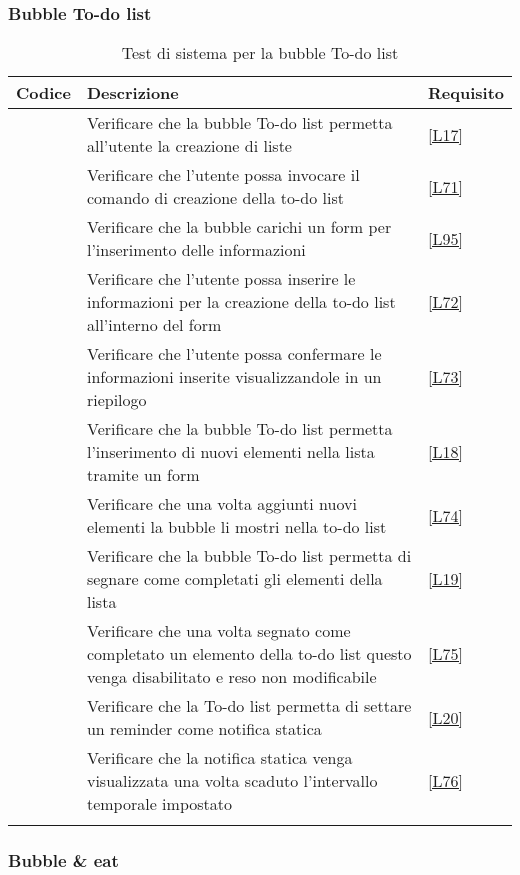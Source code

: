 \subsubsection{Bubble To-do list}

\begin{longtable}{|P{5cm}|P{5cm}|P{5cm}|}
	\hline \textbf{Codice} & \textbf{Descrizione} & \textbf{Requisito} \\
	\endfirsthead
	\hline {} & Verificare che la bubble To-do list permetta all'utente la creazione di liste & \ref{L17} \\
	\hline {} & Verificare che l'utente possa invocare il comando di creazione della to-do list & \ref{L71} \\
	\hline {} & Verificare che la bubble carichi un form per l'inserimento delle informazioni & \ref{L95} \\
	\hline {} & Verificare che l'utente possa inserire le informazioni per la creazione della to-do list all’interno del form & \ref{L72} \\
	\hline {} & Verificare che l'utente possa confermare le informazioni inserite visualizzandole in un riepilogo & \ref{L73} \\
	\hline {} & Verificare che la bubble To-do list permetta l’inserimento di nuovi elementi nella lista tramite un form & \ref{L18} \\
	\hline {} & Verificare che una volta aggiunti nuovi elementi la bubble li mostri nella to-do list & \ref{L74} \\
	\hline {} & Verificare che la bubble To-do list permetta di segnare come completati gli elementi della lista & \ref{L19} \\
	\hline {} & Verificare che una volta segnato come completato un elemento della to-do list questo venga disabilitato e reso non modificabile & \ref{L75} \\
	\hline {} & Verificare che la To-do list permetta di settare un reminder come notifica statica & \ref{L20} \\
	\hline {} & Verificare che la notifica statica venga visualizzata una volta scaduto l'intervallo temporale impostato & \ref{L76} \\
	\hline
	\caption{Test di sistema per la bubble To-do list}
\end{longtable}

\subsubsection{Bubble \& eat}


